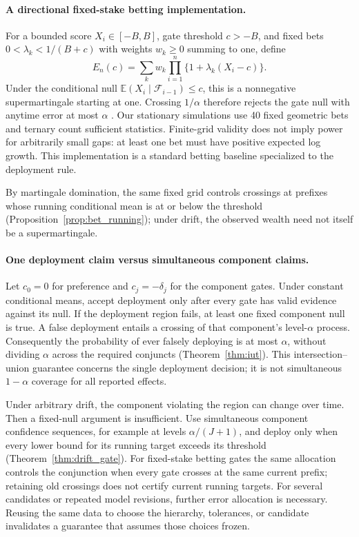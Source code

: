 \documentclass{article}
\newcommand{\E}{\mathbb E}
\begin{document}
\paragraph{A directional fixed-stake betting implementation.}
For a bounded score $X_i\in[-B,B]$, gate threshold $c>-B$, and fixed
bets $0<\lambda_k<1/(B+c)$ with weights $w_k\geq0$ summing to one,
define
\begin{equation}
 E_n(c)=\sum_k w_k\prod_{i=1}^n\{1+\lambda_k(X_i-c)\}.
 \label{eq:main_bet}
\end{equation}
Under the conditional null $\E(X_i\mid\mathcal F_{i-1})\leq c$, this
is a nonnegative supermartingale starting at one. Crossing $1/\alpha$
therefore rejects the gate null with anytime error at most $\alpha$
\citep{waudbysmith2024betting}. Our stationary simulations use 40 fixed
geometric bets and ternary count sufficient statistics. Finite-grid
validity does not imply power for arbitrarily small gaps: at least one
bet must have positive expected log growth. This implementation is a
standard betting baseline specialized to the deployment rule.

By martingale domination, the same fixed grid controls crossings at
prefixes whose running conditional mean is at or below the threshold
(Proposition~\ref{prop:bet_running}); under drift, the observed wealth
need not itself be a supermartingale.

\paragraph{One deployment claim versus simultaneous component claims.}
Let $c_0=0$ for preference and $c_j=-\delta_j$ for the component gates.
Under constant conditional means, accept deployment only after every gate
has valid evidence against its null. If the deployment region fails,
at least one fixed component null is true. A false deployment entails a
crossing of that component's level-$\alpha$ process. Consequently the
probability of ever falsely deploying is at most $\alpha$, without
dividing $\alpha$ across the required conjuncts
(Theorem~\ref{thm:iut}). This intersection--union guarantee concerns the
single deployment decision; it is not simultaneous $1-\alpha$ coverage
for all reported effects.

Under arbitrary drift, the component violating the region can change
over time. Then a fixed-null argument is insufficient. Use simultaneous
component confidence sequences, for example at levels
$\alpha/(J+1)$, and deploy only when every lower bound for its running
target exceeds its threshold (Theorem~\ref{thm:drift_gate}). For
fixed-stake betting gates the same allocation controls the conjunction
when every gate crosses at the same current prefix; retaining old
crossings does not certify current running targets. For several
candidates or repeated model revisions, further error allocation is
necessary. Reusing the same data to choose the hierarchy, tolerances,
or candidate invalidates a guarantee that assumes those choices frozen.
\end{document}
